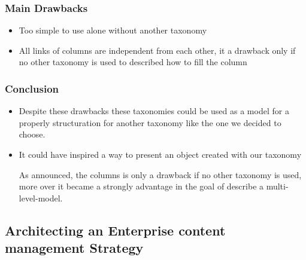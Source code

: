 \documentclass[12pt]{report}
\begin{document}
\subsubsection*{Main Drawbacks }
\begin{itemize}
	\item Too simple to use alone without another taxonomy\par
	\item All links of columns are independent from each other, it a drawback only if no other taxonomy is used to described how to fill the column\par

\end{itemize}\subsubsection*{ Conclusion}
\begin{itemize}
	\item Despite these drawbacks these taxonomies could be used as a model for a properly structuration for another taxonomy like the one we decided to choose.  \par

	\item It could have inspired a way to present an object created with our taxonomy\par

As announced, the columns  is only a drawback if no other taxonomy is used, more over it became a strongly advantage in the goal of describe a multi-level-model.\par



\newpage

\vspace{\baselineskip}
\end{itemize}\subsection*{Architecting an Enterprise content management Strategy  }

\vspace{\baselineskip}


\end{document}
